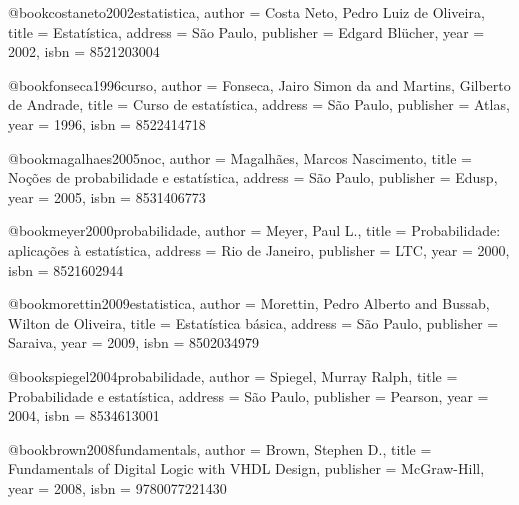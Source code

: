 @book{costaneto2002estatistica,
  author = {Costa Neto, Pedro Luiz de Oliveira},
  title = {Estatística},
  address = {São Paulo},
  publisher = {Edgard Blücher},
  year = {2002},
  isbn = {8521203004}
}

@book{fonseca1996curso,
  author = {Fonseca, Jairo Simon da and Martins, Gilberto de Andrade},
  title = {Curso de estatística},
  address = {São Paulo},
  publisher = {Atlas},
  year = {1996},
  isbn = {8522414718}
}

@book{magalhaes2005noc,
  author = {Magalhães, Marcos Nascimento},
  title = {Noções de probabilidade e estatística},
  address = {São Paulo},
  publisher = {Edusp},
  year = {2005},
  isbn = {8531406773}
}

@book{meyer2000probabilidade,
  author = {Meyer, Paul L.},
  title = {Probabilidade: aplicações à estatística},
  address = {Rio de Janeiro},
  publisher = {LTC},
  year = {2000},
  isbn = {8521602944}
}

@book{morettin2009estatistica,
  author = {Morettin, Pedro Alberto and Bussab, Wilton de Oliveira},
  title = {Estatística básica},
  address = {São Paulo},
  publisher = {Saraiva},
  year = {2009},
  isbn = {8502034979}
}

@book{spiegel2004probabilidade,
  author = {Spiegel, Murray Ralph},
  title = {Probabilidade e estatística},
  address = {São Paulo},
  publisher = {Pearson},
  year = {2004},
  isbn = {8534613001}
}

%

@book{brown2008fundamentals,
  author = {Brown, Stephen D.},
  title = {Fundamentals of Digital Logic with VHDL Design},
  publisher = {McGraw-Hill},
  year = {2008},
  isbn = {9780077221430}
}


